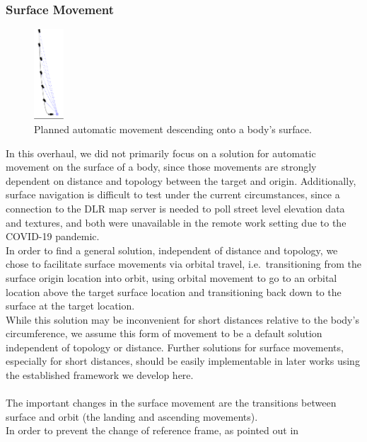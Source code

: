 \subsubsection{Surface Movement}\label{subsubsec:surface-movements}

\begin{figure}
    \centering
    \includegraphics[width=0.1\textwidth]{content/4_3_autoNavigation/img/PlannedLanding}
    \caption{Planned automatic movement descending onto a body's surface.}
    \label{fig:new-auto-nav-descend}
\end{figure}
In this overhaul, we did not primarily focus on a solution for automatic movement on the surface of a body, since
those movements are strongly dependent on distance and topology between the target and origin.
Additionally, surface navigation is difficult to test under the current circumstances, since a connection to the DLR
map server is needed to poll street level elevation data and textures, and both were unavailable in the remote work
setting due to the COVID-19 pandemic.
\\
In order to find a general solution, independent of distance and topology, we chose to facilitate surface movements
via orbital travel, i.e.\ transitioning from the surface origin location into orbit, using orbital movement to go to an
orbital location above the target surface location and transitioning back down to the surface at the target location.
\\
While this solution may be inconvenient for short distances relative to the body's circumference, we assume this form
of movement to be a default solution independent of topology or distance.
Further solutions for surface movements, especially for short distances, should be easily implementable in later
works using the established framework we develop here.
\\
\\
The important changes in the surface movement are the transitions between surface and orbit (the landing and
ascending movements).
\\
In order to prevent the change of reference frame, as pointed out in
